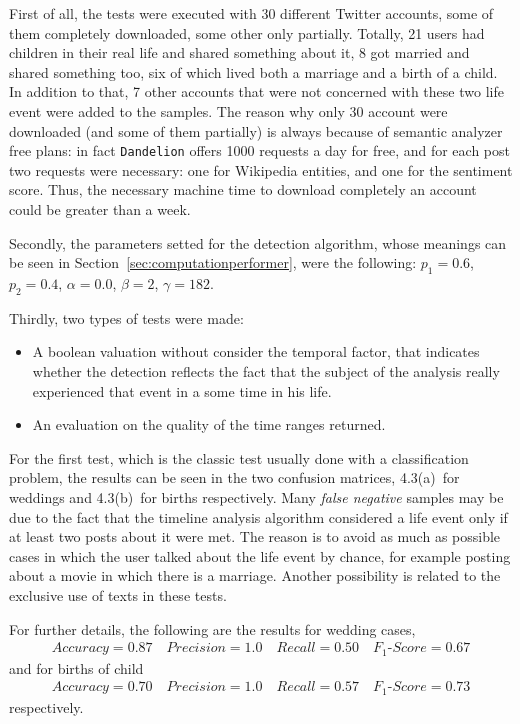 First of all, the tests were executed with 30 different Twitter accounts, some of them completely downloaded, some other only partially. Totally, 21 users had children in their real life and shared something about it, 8 got married and shared something too, six of which lived both a marriage and a birth of a child. In addition to that, 7 other accounts that were not concerned with these two life event were added to the samples. The reason why only 30 account were downloaded (and some of them partially) is always because of semantic analyzer free plans: in fact \texttt{Dandelion} offers 1000 requests a day for free, and for each post two requests were necessary: one for Wikipedia entities, and one for the sentiment score. Thus, the necessary machine time to download completely an account could be greater than a week.

Secondly, the parameters setted for the detection algorithm, whose meanings can be seen in Section~\ref{sec:computationperformer}, were the following: $p_1 = 0.6$, $p_2 = 0.4$, $\alpha = 0.0$, $ \beta = 2$, $ \gamma = 182$.

Thirdly, two types of tests were made:
\begin{itemize}
\item A boolean valuation without consider the temporal factor, that indicates whether the detection reflects the fact that the subject of the analysis really experienced that event in a some time in his life.
\item An evaluation on the quality of the time ranges returned.
\end{itemize}
For the first test, which is the classic test usually done with a classification problem, the results can be seen in the two confusion matrices, 4.3(a)~for weddings and 4.3(b)~for births respectively. Many \emph{false negative} samples may be due to the fact that the timeline analysis algorithm considered a life event only if at least two posts about it were met. The reason is to avoid as much as possible cases in which the user talked about the life event by chance, for example posting about a movie in which there is a marriage. Another possibility is related to the exclusive use of texts in these tests.

For further details, the following are the results for wedding cases,
\begin{gather}
Accuracy = 0.87 \quad Precision = 1.0 \quad Recall = 0.50 \quad F_1\text{-}Score = 0.67
\label{weddingconfdata}
\end{gather}
and for births of child
\begin{gather}
Accuracy = 0.70 \quad Precision = 1.0 \quad Recall = 0.57 \quad F_1\text{-}Score = 0.73
\label{childrenconfdata}
\end{gather}
respectively.

